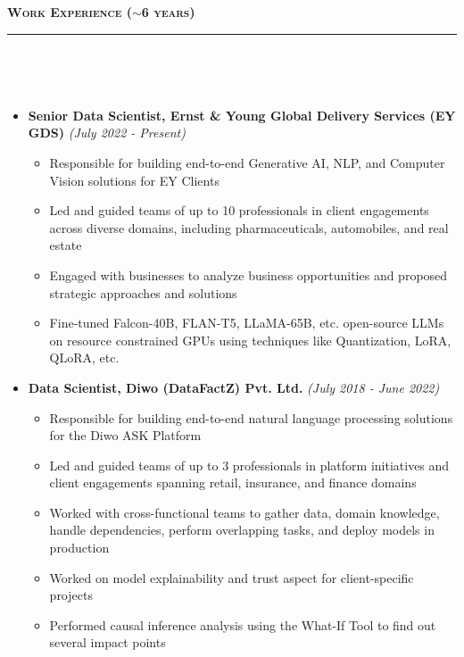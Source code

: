 \documentclass[a4paper,10pt]{article}
\newcommand{\isep}{-2 pt}
\newcommand{\lsep}{-0.5cm}
\newcommand{\resheading}[1]{{\small
        {
            \begin{minipage}
                {0.992\textwidth}\textbf{{\textsc{#1 \vphantom{p\^{E}} }}}
                \\[-0.3cm]
                \hrule
            \end{minipage}
            \\[-0.5cm]
        }
 }}
\begin{document}
\noindent
\resheading{\textbf{\large Work Experience ($\sim$6 years)}}\\[\lsep]
\begin{itemize}

    \item \textbf{Senior Data Scientist, Ernst \& Young Global Delivery Services (EY GDS)} \hfill {\emph{(July 2022 - Present)}}
    \\ [-0.6cm]
    \begin{itemize}\itemsep \isep
        \item Responsible for building end-to-end Generative AI, NLP, and Computer Vision solutions for EY Clients
        \item Led and guided teams of up to 10 professionals in client engagements across diverse domains, including pharmaceuticals, automobiles, and real estate
        \item Engaged with businesses to analyze business opportunities and proposed strategic approaches and solutions
        \item Fine-tuned Falcon-40B, FLAN-T5, LLaMA-65B, etc. open-source LLMs on resource constrained GPUs using techniques like Quantization, LoRA, QLoRA, etc.
    \\ [-0.5cm]
    \end{itemize}
    
    \item \textbf{Data Scientist, Diwo (DataFactZ) Pvt. Ltd.} \hfill {\emph{(July 2018 - June 2022)}}
    \\ [-0.6cm]
    \begin{itemize}\itemsep \isep
        \item Responsible for building end-to-end natural language processing solutions for the Diwo ASK Platform
        \item Led and guided teams of up to 3 professionals in platform initiatives and client engagements spanning retail, insurance, and finance domains
        \item Worked with cross-functional teams to gather data, domain knowledge, handle dependencies, perform overlapping tasks, and deploy models in production  
        \item Worked on model explainability and trust aspect for client-specific projects
        \item Performed causal inference analysis using the What-If Tool to find out several impact points
    \\ [-0.5cm]
    \end{itemize}
    

\end{itemize}
\end{document}
